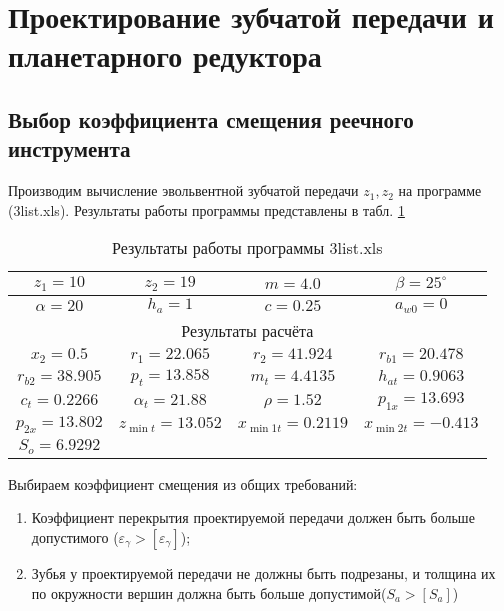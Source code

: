 \section{Проектирование зубчатой передачи и планетарного редуктора}

\subsection{Выбор коэффициента смещения реечного инструмента}

Производим вычисление эвольвентной зубчатой передачи $z_1, z_2$ на программе (3list.xls). Результаты работы программы представлены в табл. \ref{table:3list} 

\begin{table}[b]
	
\caption{Результаты работы программы 3list.xls}

\begin{tabular}{|c|c|c|c|}
	\hline 
	$z_1 = 10$ & $z_2 = 19$ & $m = 4.0$ & $\beta = 25^{\circ}$ \\ 
	\hline 
	$\alpha = 20$ & $h_{a} = 1$ & $c = 0.25$ & $a_{w0} = 0$ \\ 
	\hline 
	\multicolumn{4}{|c|}{Результаты расчёта} \\ 
	\hline 
	$x_2 = 0.5$ & $r_{1} = 22.065$ & $r_{2} = 41.924$ & $r_{b1} = 20.478$ \\ 
	\hline 
	$r_{b2} = 38.905$ & $p_t = 13.858$ & $m_t = 4.4135$ & $h_{at} = 0.9063$ \\ 
	\hline 
	$c_t = 0.2266$ & $\alpha_t = 21.88$ & $\rho = 1.52$ & $p_{1x} = 13.693$ \\ 
	\hline 
	$p_{2x} = 13.802$ & $z_{\min t} = 13.052$ & $x_{\min 1t} = 0.2119$ & $x_{\min 2t} = -0.413$ \\ 
	\hline 
	$S_o = 6.9292$ &  &  &  \\ 
	\hline 
\end{tabular}
\label{table:3list}

\end{table}

Выбираем коэффициент смещения из общих требований:

\begin{enumerate}
	\item Коэффициент перекрытия проектируемой передачи должен быть больше допустимого ($ \varepsilon_{\gamma} > [\varepsilon_{\gamma}] $);
	\item Зубья у проектируемой передачи не должны быть подрезаны, и толщина их по окружности вершин должна быть больше допустимой($ S_a > [S_a] $)
\end{enumerate}

